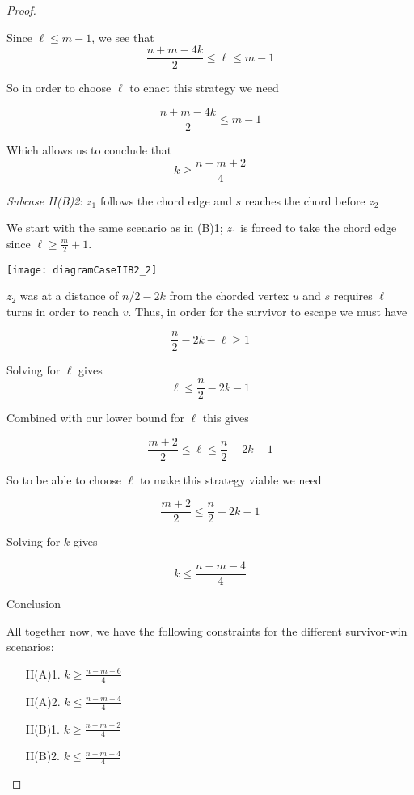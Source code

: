 \documentclass[letterpaper, 10pt]{article}
\begin{document}
\begin{proof}
\begin{proofpart}
Since $\ell \leq m -1$, we see that
\[ \frac{n+m-4k}{2} \leq \ell \leq m-1 \]

So in order to choose $\ell$ to enact this strategy we need

\[ \frac{n+m-4k}{2} \leq m-1 \]

Which allows us to conclude that
\[ k \geq \frac{n-m+2}{4} \]

\emph{Subcase II(B)2}: $z_1$ follows the chord edge and $s$ reaches the chord before $z_2$

We start with the same scenario as in (B)1; $z_1$ is forced to take the chord edge since
$\ell \geq \frac{m}{2} +1$.

\begin{center}
\texttt{[image: diagramCaseIIB2\_2]}
\end{center}

$z_2$ was at a distance of $n/2-2k$ from the chorded vertex $u$ and $s$ requires
$\ell$ turns in order to reach $v$. Thus, in order for the survivor to escape
we must have

\[ \frac{n}{2} -2k - \ell \geq 1 \]

Solving for $\ell$ gives
\[ \ell \leq \frac{n}{2} -2k -1 \]

Combined with our lower bound for $\ell$ this gives

\[ \frac{m+2}{2} \leq \ell \leq \frac{n}{2} -2k -1 \]

So to be able to choose $\ell$ to make this strategy viable we need

\[ \frac{m+2}{2} \leq \frac{n}{2} -2k -1 \]

Solving for $k$ gives

\[ k \leq \frac{n-m-4}{4} \]

\end{proofpart}

\begin{proofpart} Conclusion


All together now, we have the following constraints for the different survivor-win scenarios:

\begin{itemize}
\item[II(A)1.] $k \geq \frac{n-m+6}{4}$
\item[II(A)2.] $k \leq \frac{n-m-4}{4}$
\item[II(B)1.] $k \geq \frac{n-m+2}{4}$
\item[II(B)2.] $k \leq \frac{n-m-4}{4}$

\end{itemize}


\end{proofpart}
\end{proof}
\end{document}
